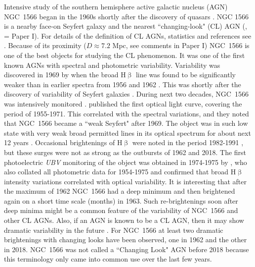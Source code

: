\documentclass[fleqn,usenatbib]{mnras}
\begin{document}
Intensive study of the southern hemisphere active galactic nucleus (AGN) NGC~1566 began in the 1960s shortly after the discovery of quasars \citep{Silva2017, Oknyansky2019, Oknyansky2019b, Parker2019}. NGC 1566 is a nearby face-on Seyfert galaxy \citep{Vaucouleurs1961, Vaucouleurs1973, Shobbrook1966} and the nearest ``changing-look" (CL) AGN (\citealt{Oknyansky2018b}, \citealt{Oknyansky2019} = Paper I).  For details of the definition of CL AGNs, statistics and references see \cite{Shappee2014, MacLeod2019, Ruan2019,  Runnoe2016}. Because of its proximity ($D\approx7.2$ Mpc, see comments in Paper I) NGC~1566 is one of the best objects for studying the CL phenomenon. It was one of the first known AGNs with spectral and photometric variability.  Variability was discovered in 1969 by \cite{Pastoriza1970} when the broad H$\upbeta$ line was found to be significantly weaker than in earlier spectra from 1956 \citep{Vaucouleurs1961} and 1962 \citep{Shobbrook1966}. This was shortly after the discovery of variability of Seyfert galaxies  \citep{Fitch1967}.  During next two decades, NGC~1566 was intensively monitored \citep{Quintana1975, Alloin1985, Winkler1992, Baribaud1992}.
\cite{Quintana1975} published the first optical light curve, covering the period of 1955-1971.  This correlated with the spectral variations, and they noted that NGC~1566 became a ``weak Seyfert" after 1969. The object was in such low state with very weak broad permitted lines in its optical spectrum for about next  12 years \citep{Alloin1986}. Occasional brightenings of H$\upbeta$ were noted in the period 1982-1991 \citep{Alloin1985, Alloin1986, Kriss1991, Winkler1992, Baribaud1992}, but these surges were not as strong as the outbursts of 1962 and 2018. The first photoelectric {\it UBV} monitoring of the object was obtained in 1974-1975 by \citet{Penfold1979}, who also collated all photometric data for 1954-1975 and confirmed that broad H$\upbeta$ intensity variations correlated with optical variability. It is interesting that after the maximum of 1962 NGC~1566 had a deep minimum and then brightened again on a short time scale (months) in 1963. Such re-brightenings soon after deep minima might be a common feature of the variability of NGC~1566 and other CL AGNs.  Also, if an AGN is known to be a CL AGN, then it may show  dramatic variability in the future \citep{MacLeod2019}.   For NGC~1566 at least two dramatic brightenings with changing looks have been observed, one in 1962 and the other in 2018. NGC~1566 was not called a ``Changing Look" AGN before 2018 \citep{Oknyansky2018b} because this terminology only came into common use  over the last few years.
\end{document}
